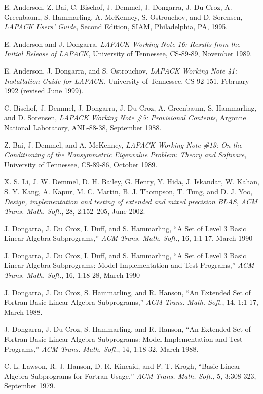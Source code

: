 \documentclass[11pt]{report}
\begin{document}
\newpage
{}

\begin{thebibliography}{9}

E. Anderson, Z. Bai, C. Bischof, J. Demmel, J. Dongarra,
J. Du Croz, A. Greenbaum, S. Hammarling, A. McKenney,
S. Ostrouchov, and D. Sorensen,
\textit{LAPACK Users' Guide}, Second Edition,
{SIAM}, Philadelphia, PA, 1995.

E. Anderson and J. Dongarra,
\textit{LAPACK Working Note 16:
Results from the Initial Release of LAPACK},
University of Tennessee, CS-89-89, November 1989.

E. Anderson, J. Dongarra, and S. Ostrouchov,
\textit{LAPACK Working Note 41:
Installation Guide for LAPACK},
University of Tennessee, CS-92-151, February 1992 (revised June 1999).

C. Bischof, J. Demmel, J. Dongarra, J. Du Croz, A. Greenbaum,
S. Hammarling, and D. Sorensen,
\textit{LAPACK Working Note \#5:  Provisional Contents},
Argonne National Laboratory, ANL-88-38, September 1988.

Z. Bai, J. Demmel, and A. McKenney,
\textit{LAPACK Working Note \#13: On the Conditioning of the Nonsymmetric
Eigenvalue Problem:  Theory and Software},
University of Tennessee, CS-89-86, October 1989.

X. S. Li, J. W. Demmel, D. H. Bailey, G. Henry, Y. Hida, J. Iskandar,
W. Kahan, S. Y. Kang, A. Kapur, M. C. Martin, B. J. Thompson, T. Tung,
and D. J. Yoo, \textit{Design, implementation and testing of extended
  and mixed precision BLAS},
\textit{ACM Trans. Math. Soft.}, 28, 2:152--205, June 2002.

J. Dongarra, J. Du Croz, I. Duff, and S. Hammarling,
``A Set of Level 3 Basic Linear Algebra Subprograms,''
\textit{ACM Trans. Math. Soft.}, 16, 1:1-17, March 1990

J. Dongarra, J. Du Croz, I. Duff, and S. Hammarling,
``A Set of Level 3 Basic Linear Algebra Subprograms:
Model Implementation and Test Programs,''
\textit{ACM Trans. Math. Soft.}, 16, 1:18-28, March 1990

J. Dongarra, J. Du Croz, S. Hammarling, and R. Hanson,
``An Extended Set of Fortran Basic Linear Algebra Subprograms,''
\textit{ACM Trans. Math. Soft.}, 14, 1:1-17, March 1988.

J. Dongarra, J. Du Croz, S. Hammarling, and R. Hanson,
``An Extended Set of Fortran Basic Linear Algebra Subprograms:
Model Implementation and Test Programs,''
\textit{ACM Trans. Math. Soft.}, 14, 1:18-32, March 1988.

C. L. Lawson, R. J. Hanson, D. R. Kincaid, and F. T. Krogh,
``Basic Linear Algebra Subprograms for Fortran Usage,''
\textit{ACM Trans. Math. Soft.}, 5, 3:308-323, September 1979.

\end{thebibliography}
\end{document}
